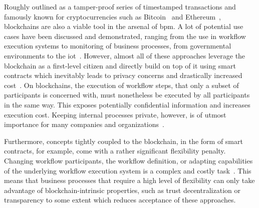 Roughly outlined as a tamper-proof series of timestamped transactions and famously known for cryptocurrencies such as Bitcoin~\cite{nakamoto2009} and Ethereum~\cite{buterin2020}, blockchains are also a viable tool in the arsenal of \gls{bpm}. A lot of potential use cases have been discussed and demonstrated, ranging from the use in workflow execution systems to monitoring of business processes, from governmental environments to the \gls{iot}~\cite{blockchains_for_bpmn_challenges_and_opportunities,untrusted_bp_execution_using_blockchain,lean_architecture_for_blockchain_based_process_execution,interpreted_bp_on_blockchain_loukil,blockchain_and_iot_for_bpm}. However, almost all of these approaches leverage the blockchain as a first-level citizen and directly build on top of it using smart contracts which inevitably leads to privacy concerns and drastically increased cost~\cite{ethereum_yellow_paper}. On blockchains, the execution of workflow steps, that only a subset of participants is concerned with, must nonetheless be executed by all participants in the same way. This exposes potentially confidential information and increases execution cost. Keeping internal processes private, however, is of utmost importance for many companies and organizations~\cite{farah2021_security_of_bps,carminati2018_confidential_bp_execution_on_blockchain}.

Furthermore, concepts tightly coupled to the blockchain, in the form of smart contracts, for example, come with a rather significant flexibility penalty. Changing workflow participants, the workflow definition, or adapting capabilities of the underlying workflow execution system is a complex and costly task~\cite{ethereum_yellow_paper,monitoring_financial_stability_cryptocurrencies}. This means that business processes that require a high level of flexibility can only take advantage of blockchain-intrinsic properties, such as trust decentralization or transparency to some extent which reduces acceptance of these approaches.



